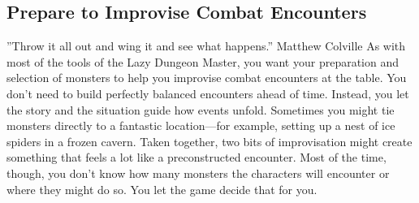 \documentclass[10pt,a4paper,twoside,bg=print,twocolumn,openany,nodeprecatedcode]{dndbook}
\begin{document}
\subsection{Prepare to Improvise Combat Encounters}
\DndQuote%
{}
{''Throw it all out and wing it and see what happens.''}
{Matthew Colville}
As with most of the tools of the Lazy Dungeon Master, you want your preparation and selection of monsters to help you improvise combat encounters at the table. You don't need to build perfectly balanced encounters ahead of time. Instead, you let the story and the situation guide how events unfold.
Sometimes you might tie monsters directly to a fantastic location—for example, setting up a nest of ice spiders in a frozen cavern. Taken together, two bits of improvisation might create something that feels a lot like a preconstructed encounter. Most of the time, though, you don't know how many monsters the characters will encounter or where they might do so. You let the game decide that for you.
\end{document}
